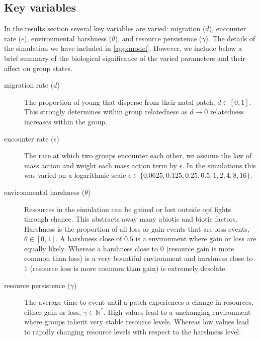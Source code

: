 \subsection{Key variables}
In the results section several key variables are varied: migration ($d$), 
encounter rate ($\epsilon$), environmental harshness ($\theta$), and resource persistence ($\gamma$).
The details of the simulation we have included in \cref{app:model}. However, we include below a brief summary of the biological significance of the varied parameters and their affect on group states. 
\begin{description}
    \item[migration rate ($d$)] The proportion of young that disperse from their natal patch, $d \in [0,1]$. This strongly determines within group relatedness as $d\rightarrow0$ relatedness increases within the group.
    \item[encounter rate ($\epsilon$)] The rate at which two groups encounter each other, we assume the law of mass action and weight each mass action term by $\epsilon$. In the simulations this was varied on a 
    logarithmic scale  $\epsilon \in \{0.0625,\allowbreak 0.125, 0.25, 0.5, 1, 2, 4, 8, 16\}$.
    \item[environmental harshness ($\theta$)] Resources in the simulation can be gained or lost outside opf fights through chance. This abstracts away many abiotic and biotic factors. Harshness is the proportion of all loss or gain events that are loss events, $\theta \in [0,1]$. A harshness close of $0.5$ is a environment where gain or loss are equally likely. Whereas a harshness close to $0$ (resource gain is more common than loss) is a very bountiful environment and harshness close to $1$ (resource loss is more common than gain) is extremely desolate. 
    \item[resource persistence ($\gamma$)] The average time to event until a patch experiences a change in resources, either gain or loss, $\gamma \in \mathbb{N^\ast}$. High values lead to a unchanging environment where groups inherit very stable resource levels. Whereas low values lead to rapidly changing resource levels with respect to the harshness level.   
\end{description}

